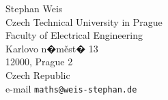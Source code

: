 \documentclass[a4paper,11pt,reqno]{amsart}
\theoremstyle{definition}
\theoremstyle{remark}
\numberwithin{equation}{section}
\begin{document}
%
%
%
\vspace{\baselineskip}
%
\parbox{10cm}{%
Stephan Weis\\
Czech Technical University in Prague\\ 
Faculty of Electrical Engineering\\
Karlovo n�m\v{e}st� 13\\
12000, Prague 2\\
Czech Republic\\
e-mail \texttt{maths@weis-stephan.de}}
\end{document}
